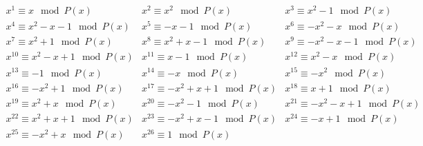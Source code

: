 $$\begin{array}{ccc}
x^{1} \equiv x \mod P(x) & x^{2} \equiv x^2 \mod P(x) & x^{3} \equiv x^2 - 1 \mod P(x) \\
x^{4} \equiv x^2 - x - 1 \mod P(x) & x^{5} \equiv - x - 1 \mod P(x) & x^{6} \equiv - x^2 - x \mod P(x) \\
x^{7} \equiv x^2 + 1 \mod P(x) & x^{8} \equiv x^2 + x - 1 \mod P(x) & x^{9} \equiv - x^2 - x - 1 \mod P(x) \\
x^{10} \equiv x^2 - x + 1 \mod P(x) & x^{11} \equiv x - 1 \mod P(x) & x^{12} \equiv x^2 - x \mod P(x) \\
x^{13} \equiv -1 \mod P(x) & x^{14} \equiv - x \mod P(x) & x^{15} \equiv - x^2 \mod P(x) \\
x^{16} \equiv - x^2 + 1 \mod P(x) & x^{17} \equiv - x^2 + x + 1 \mod P(x) & x^{18} \equiv x + 1 \mod P(x) \\
x^{19} \equiv x^2 + x \mod P(x) & x^{20} \equiv - x^2 - 1 \mod P(x) & x^{21} \equiv - x^2 - x + 1 \mod P(x) \\
x^{22} \equiv x^2 + x + 1 \mod P(x) & x^{23} \equiv - x^2 + x - 1 \mod P(x) & x^{24} \equiv - x + 1 \mod P(x) \\
x^{25} \equiv - x^2 + x \mod P(x) & x^{26} \equiv 1 \mod P(x) & \end{array}$$
